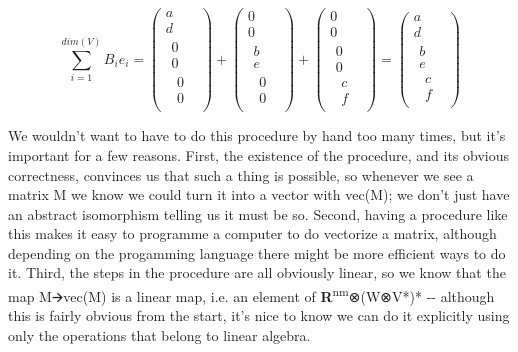 \documentclass[oneside,english]{amsbook}
\numberwithin{section}{chapter}
\theoremstyle{plain}
\theoremstyle{definition}
\begin{document}
\[\sum_{i = 1}^{dim(V)}{B_{i}e_{i} = \begin{pmatrix}
		a \\
		d \\
		\begin{matrix}
			0 \\
			0 \\
			\begin{matrix}
				0 \\
				0
			\end{matrix}
		\end{matrix}
	\end{pmatrix} + \begin{pmatrix}
		0 \\
		0 \\
		\begin{matrix}
			b \\
			e \\
			\begin{matrix}
				0 \\
				0
			\end{matrix}
		\end{matrix}
	\end{pmatrix} + \begin{pmatrix}
		0 \\
		0 \\
		\begin{matrix}
			0 \\
			0 \\
			\begin{matrix}
				c \\
				f
			\end{matrix}
		\end{matrix}
	\end{pmatrix} = \begin{pmatrix}
		a \\
		d \\
		\begin{matrix}
			b \\
			e \\
			\begin{matrix}
				c \\
				f
			\end{matrix}
		\end{matrix}
\end{pmatrix}}\]

We wouldn't want to have to do this procedure by hand too many times,
but it's important for a few reasons. First, the existence of the
procedure, and its obvious correctness, convinces us that such a thing
is possible, so whenever we see a matrix M we know we could turn it into
a vector with vec(M); we don't just have an abstract isomorphism telling
us it must be so. Second, having a procedure like this makes it easy to
programme a computer to do vectorize a matrix, although depending on the
progamming language there might be more efficient ways to do it. Third,
the steps in the procedure are all obviously linear, so we know that the
map M🡪vec(M) is a linear map, i.e. an element of
\textbf{R}\textsuperscript{nm}⊗(W⊗V*)* -\/- although this is fairly
obvious from the start, it's nice to know we can do it explicitly using
only the operations that belong to linear algebra.
\end{document}
